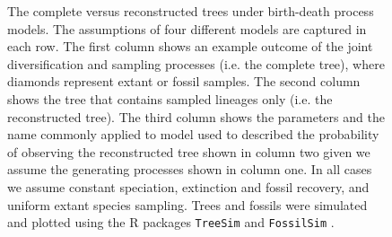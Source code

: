 \documentclass{cup-elements}
\begin{document}
\begin{figure}
\centering
\caption{The complete versus reconstructed trees under birth-death process models.
The assumptions of four different models are captured in each row.
The first column shows an example outcome of the joint diversification and sampling processes (i.e. the complete tree), where diamonds represent  extant or fossil samples.
The second column shows the tree that contains sampled lineages only (i.e. the reconstructed tree). 
The third column shows the parameters and the name commonly applied to model used to described the probability of observing the reconstructed tree shown in column two given we assume the generating processes shown in column one.
In all cases we assume constant speciation, extinction and fossil recovery, and uniform extant species sampling.
Trees and fossils were simulated and plotted using the R packages \texttt{TreeSim} \citep{Stadler2011} and \texttt{FossilSim} \citep{BaridoSottani2019b}.}
\label{fig:birth-death}
\end{figure}
\end{document}
